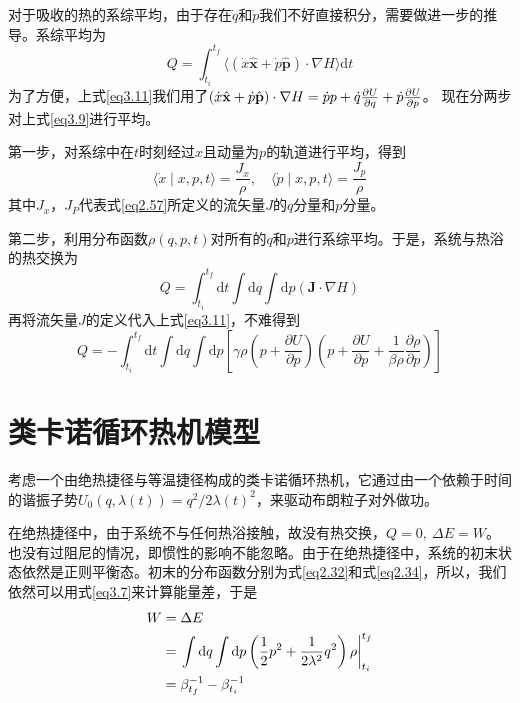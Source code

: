 对于吸收的热的系综平均，由于存在$\dot{q}$和$\dot{p}$我们不好直接积分，需要做进一步的推导。系综平均为
\begin{equation}
    Q=\int_{t_i}^{t_f}\langle(\dot{x} \hat{\mathbf{x}}+\dot{p} \hat{\mathbf{p}}) \cdot \nabla H\rangle \mathrm{d} t
    \label{eq3.9}
\end{equation}
为了方便，上式\eqref{eq3.11}我们用了$(\dot{x} \hat{\mathbf{x}}+\dot{p} \hat{\mathbf{p}}) \cdot \nabla H  = \dot{p} p+\dot{q} \frac{\partial U}{\partial q} +  \dot{p} \frac{\partial U}{\partial p}$。
现在分两步对上式\eqref{eq3.9}进行平均。

第一步，对系综中在$t$时刻经过$x$且动量为$p$的轨道进行平均，得到
\begin{equation}
    \langle\dot{x} \mid x, p, t\rangle=\frac{J_{x}}{\rho}, \quad\langle\dot{p} \mid x, p, t\rangle=\frac{J_{p}}{\rho}
    \label{eq3.10}
\end{equation}
其中$J_x$，$J_P$代表式\eqref{eq2.57}所定义的流矢量$J$的$q$分量和$p$分量。

第二步，利用分布函数$\rho(q,p,t)$对所有的$q$和$p$进行系综平均。于是，系统与热浴的热交换为
\begin{equation}
    Q=\int_{t_i}^{t_f} \mathrm{d} t \int \mathrm{d} q \int \mathrm{d} p(\bm{J} \cdot \nabla H)
    \label{eq3.11}
\end{equation}
再将流矢量$J$的定义代入上式\eqref{eq3.11}，不难得到
\begin{equation}
    Q=-\int_{t_i}^{t_f} \mathrm{d} t \int \mathrm{d} q \int \mathrm{d} p\left[\gamma \rho\left(p+\frac{\partial U}{\partial p}\right)\left(p+\frac{\partial U}{\partial p}+\frac{1}{\beta \rho} \frac{\partial \rho}{\partial p}\right)\right]
    \label{eq3.12}
\end{equation}

\section{类卡诺循环热机模型}
\qquad 考虑一个由绝热捷径与等温捷径构成的类卡诺循环热机，它通过由一个依赖于时间的谐振子势$U_{0}(q, \lambda(t))= q^{2}/2{\lambda(t)}^2 $，来驱动布朗粒子对外做功。

在绝热捷径中，由于系统不与任何热浴接触，故没有热交换，$Q=0,\ \Delta E = W$。也没有过阻尼的情况，即惯性的影响不能忽略。由于在绝热捷径中，系统的初末状态依然是正则平衡态。初末的分布函数分别为式\eqref{eq2.32}和式\eqref{eq2.34}，所以，我们依然可以用式\eqref{eq3.7}来计算能量差，于是
\begin{equation}
    \begin{split}
        W &= \Delta E\\
        &= \left.\int \mathrm{d} q \int \mathrm{d} p \left(\frac{1}{2} p^2 + \frac{1}{2 \lambda^2} q^2 \right) \rho \right|_{t_{i}} ^{t_{f}}\\
        &=\beta_{t_f}^{-1}-\beta_{t_i}^{-1}
    \end{split}
    \label{eq3.15.5}
\end{equation}

